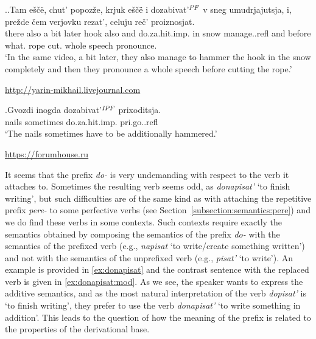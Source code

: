 \ex.\label{ex:dozabivat}\ag.Tam e\v{s}\v{c}\"{e}, chut' popoz\v{z}e, krjuk e\v{s}\v{c}\"{e} i dozabivat'$^{\mathit{PF}}$ v sneg umudrjajutsja, i, pre\v{z}de \v{c}em verjovku rezat', celuju re\v{c}' proiznosjat.\\
there also {a bit} later hook also and do.za.hit.imp. in snow manage..refl and before what. rope cut. whole speech pronounce.\\
\vspace{0.5em}
`In the same video, a bit later, they also manage to hammer the hook in the snow completely and then they pronounce a whole speech before cutting the rope.'
\begin{flushright}
\vspace{-0.5em}
\url{http://yarin-mikhail.livejournal.com}
\end{flushright}
\bg.Gvozdi inogda dozabivat'$^{\mathit{IPF}}$ prixoditsja.\\
nails sometimes do.za.hit.imp. pri.go..refl\\
\vspace{0.5em}
`The nails sometimes have to be additionally hammered.'
\begin{flushright}
\vspace{-0.5em}
\url{https://forumhouse.ru}
\end{flushright}

It seems that the prefix \textit{do-} is very undemanding with respect to the verb it attaches to. Sometimes the resulting verb seems odd, as \textit{donapisat'} `to finish writing', but such difficulties are of the same kind as with attaching the repetitive prefix \textit{pere-} to some perfective verbs (see Section~\ref{subsection:semantics:pere}) and we do find these verbs in some contexts. Such contexts require exactly the semantics obtained by composing the semantics of the prefix \textit{do-} with the semantics of the prefixed verb (e.g., \textit{napisat} `to write/create something written') and not with the semantics of the unprefixed verb (e.g., \textit{pisat'} `to write'). An example is provided in \ref{ex:donapisat} and the contrast sentence with the replaced verb is given in \ref{ex:donapisat:mod}. As we see, the speaker wants to express the additive semantics, and as the most natural interpretation of the verb \textit{dopisat'} is `to finish writing', they prefer to use the verb \textit{donapisat'} `to write something in addition'. This leads to the question of how the meaning of the prefix is related to the properties of the derivational base.

